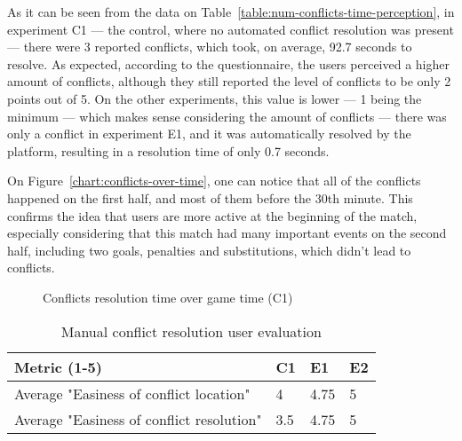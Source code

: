 As it can be seen from the data on Table~\ref{table:num-conflicts-time-perception}, in experiment C1 --- the control, where no automated conflict resolution was present --- there were 3 reported conflicts, which took, on average, 92.7 seconds to resolve. As expected, according to the questionnaire, the users perceived a higher amount of conflicts, although they still reported the level of conflicts to be only 2 points out of 5. On the other experiments, this value is lower --- 1 being the minimum --- which makes sense considering the amount of conflicts --- there was only a conflict in experiment E1, and it was automatically resolved by the platform, resulting in a resolution time of only 0.7 seconds.

On Figure~\ref{chart:conflicts-over-time}, one can notice that all of the conflicts happened on the first half, and most of them before the 30th minute. This confirms the idea that users are more active at the beginning of the match, especially considering that this match had many important events on the second half, including two goals, penalties and substitutions, which didn't lead to conflicts.

\begin{figure}
    \centering
    \caption{Conflicts resolution time over game time (C1)}
    \label{chart:conflicts-res-time-over-time}
\end{figure}

\begin{table}
    \centering
    \caption{Manual conflict resolution user evaluation}
    \begin{tabular}{|l|l|l|l|}
        \hline
        \textbf{Metric (1-5)}                        & \textbf{C1} & \textbf{E1} & \textbf{E2} \\ \hline \hline
        Average "Easiness of conflict location"   & 4  & 4.75  & 5  \\ \hline
        Average "Easiness of conflict resolution"   & 3.5  & 4.75  & 5  \\ \hline
    \end{tabular}
    \label{table:conflicts-resolution-user-perception}
\end{table}

